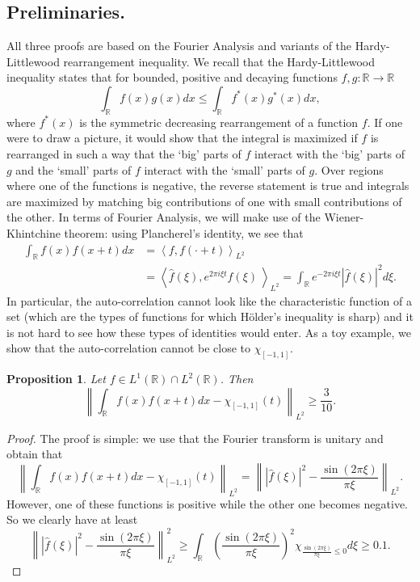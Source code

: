 \documentclass{amsart}
\newtheorem*{proposition}{Proposition}
\theoremstyle{remark}
\begin{document}
{\subsection{Preliminaries.}
All three proofs are based on the Fourier Analysis and variants of the Hardy-Littlewood rearrangement inequality. We recall that the Hardy-Littlewood inequality states that for bounded, positive and decaying functions $f, g:\mathbb{R} \rightarrow \mathbb{R}$
$$ \int_{\mathbb{R}}{f(x)g(x)dx} \leq \int_{\mathbb{R}}{ f^*(x) g^*(x) dx},$$
where $f^*(x)$ is the symmetric decreasing rearrangement of a function $f$. If one were to draw a picture, it would show that the integral is maximized if $f$ is rearranged in such a way that the `big' parts of $f$ interact with the `big' parts of $g$ and the `small' parts of $f$ interact with the `small' parts of $g$. Over regions where one of the functions is negative, the reverse statement is true and integrals are maximized by matching big contributions of one with small contributions of the other.
In terms of Fourier Analysis, we will make use of the Wiener-Khintchine theorem: using Plancherel's identity, we see that
\begin{align*}
 \int_{\mathbb{R}}{f(x)f(x+t) dx} &= \left\langle f, f(\cdot + t) \right\rangle_{L^2} \\
&=  \left\langle \widehat{f}(\xi), e^{2 \pi i \xi t} \widehat{f}(\xi)~ \right\rangle_{L^2} = \int_{\mathbb{R}}{e^{-2 \pi i \xi t} |\widehat{f}(\xi)|^2 d\xi}.
\end{align*}
In particular, the auto-correlation cannot look like the
characteristic function of a set (which are the types of functions for which H\"older's inequality is sharp)
and it is not hard to see how these types of identities would enter. As a toy example, we show that the
auto-correlation cannot be close to $\chi_{[-1,1]}$. 
\begin{proposition} Let $f \in L^1(\mathbb{R}) \cap L^2(\mathbb{R})$. Then
$$ \left\| \int_{\mathbb{R}}{f(x)f(x+t) dx} - \chi_{[-1,1]}(t) \right\|_{L^2} \geq \frac{3}{10}.$$
\end{proposition}
\begin{proof} The proof is simple: we use that the Fourier transform is unitary and obtain that
$$ \left\| \int_{\mathbb{R}}{f(x)f(x+t) dx} - \chi_{[-1,1]}(t) \right\|_{L^2} = \left\|  |\widehat{f}(\xi)|^2 - \frac{\sin{(2\pi \xi)}}{\pi \xi} \right\|_{L^2}.$$
However, one of these functions is positive while the other one becomes negative. So we clearly have at least
$$ \left\| |\widehat{f}(\xi)|^2 - \frac{\sin{(2\pi \xi)}}{\pi \xi} \right\|^2_{L^2} \geq \int_{\mathbb{R}}{ \left(\frac{\sin{(2\pi \xi)}}{\pi \xi}\right)^2 \chi_{\frac{\sin{(2\pi \xi)}}{\pi \xi} \leq 0} d\xi} \geq 0.1.$$
\end{proof}





}
\end{document}

